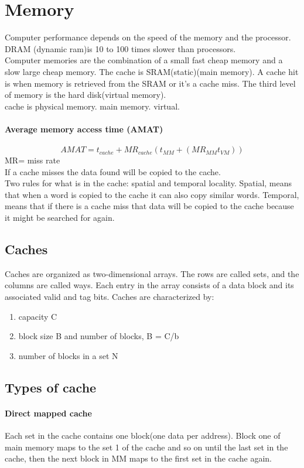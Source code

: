 \newpage
\section{Memory}
	Computer performance depends on the speed of the memory and the processor. DRAM (dynamic ram)is 10 to 100 times slower than processors.\\
	Computer memories are the combination of a small fast cheap memory and a slow large cheap memory. The cache is SRAM(static)(main memory). A cache hit is when memory is retrieved from the SRAM or it's a cache miss. The third level of memory is the hard disk(virtual memory).\\
	cache is physical memory. main memory. virtual.
	\paragraph{Average memory access time (AMAT)}
	\begin{equation}
		AMAT = t_{cache}+ MR_{cache}(t_{MM} + (MR_{MM}t_{VM}))
	\end{equation}
	MR= miss rate\\
	If a cache misses the data found will be copied to the cache.\\
	Two rules for what is in the cache: spatial and temporal locality. Spatial, means that when a word is copied to the cache it can also copy similar words. Temporal, means that if there is a cache miss that data will be copied to the cache because it might be searched for again.
	\subsection{Caches}
		Caches are organized as two-dimensional arrays. The rows are called sets, and the columns are called ways. Each entry in the array consists of a data block and its associated valid and tag bits. Caches are characterized by:
		\begin{enumerate}
			\item capacity C
			\item block size B and number of blocks, B = C/b
			\item number of blocks in a set N
		\end{enumerate}
	\subsection{Types of cache}
	\paragraph{Direct mapped cache}
		Each set in the cache contains one block(one data per address). Block one of main memory maps to the set 1 of the cache and so on until the last set in the cache, then the next block in MM maps to the first set in the cache again.

